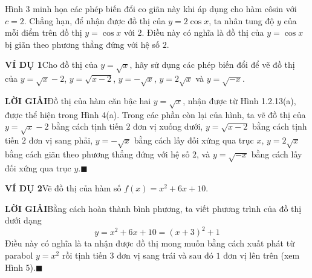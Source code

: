 \begin{minipage}[t]{0.708\textwidth}
    \fontsize{9.3pt}{13.2pt}\selectfont
    Hình 3 minh họa các phép biến đổi co giãn này khi áp dụng cho hàm côsin với $c = 2$. Chẳng hạn, để nhận được đồ thị của $y = 2\cos x$, ta nhân tung độ $y$ của mỗi điểm trên đồ thị $y = \cos x$ với $2$. Điều này có nghĩa là đồ thị của $y = \cos x$ bị giãn theo phương thẳng đứng với hệ số $2$.

    \vspace{1.2em}
    \noindent
    \textbf{\textsf{\color{stewartcyan}VÍ DỤ 1}}\quad Cho đồ thị của $y = \sqrt{x}$, hãy sử dụng các phép biến đổi để vẽ đồ thị của $y = \sqrt{x} - 2$, $y = \sqrt{x - 2}$, $y = -\sqrt{x}$, $y = 2\sqrt{x}$ và $y = \sqrt{-x}$.

    \vspace{0.5em}
    \noindent
    \textbf{\textsf{\color{stewartcyan}LỜI GIẢI}}\quad Đồ thị của hàm căn bậc hai $y = \sqrt{x}$, nhận được từ Hình 1.2.13(a), được thể hiện trong Hình 4(a). Trong các phần còn lại của hình, ta vẽ đồ thị của $y = \sqrt{x} - 2$ bằng cách tịnh tiến $2$ đơn vị xuống dưới, $y = \sqrt{x - 2}$ bằng cách tịnh tiến $2$ đơn vị sang phải, $y = -\sqrt{x}$ bằng cách lấy đối xứng qua trục $x$, $y = 2\sqrt{x}$ bằng cách giãn theo phương thẳng đứng với hệ số $2$, và $y = \sqrt{-x}$ bằng cách lấy đối xứng qua trục $y$.\hfill{\color{stewartcyan}$\blacksquare$}

    \vspace{2.2em}
    \noindent
    \textbf{\textsf{\color{stewartcyan}VÍ DỤ 2}}\quad Vẽ đồ thị của hàm số $f(x) = x^2 + 6x + 10$.

    \vspace{0.5em}
    \noindent
    \textbf{\textsf{\color{stewartcyan}LỜI GIẢI}}\quad Bằng cách hoàn thành bình phương, ta viết phương trình của đồ thị dưới dạng
    \[
    y = x^2 + 6x + 10 = (x + 3)^2 + 1
    \]
    Điều này có nghĩa là ta nhận được đồ thị mong muốn bằng cách xuất phát từ parabol $y = x^2$ rồi tịnh tiến $3$ đơn vị sang trái và sau đó $1$ đơn vị lên trên (xem Hình 5).\hfill{\color{stewartcyan}$\blacksquare$}
\end{minipage}